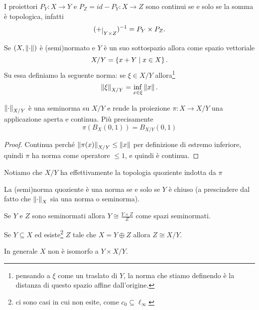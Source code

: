 \begin{remark}
I proiettori $P_Y:X\to Y$ e $P_Z=id-P_Y:X\to Z$ sono continui se e solo se la somma \`e topologica, infatti
\[(+\res{Y\times Z})\ii=P_Y\times P_Z.\]
\end{remark}

\begin{definition}
Se $(X,\left\Vert{\cdot}\right\Vert)$ \`e (semi)normato e $Y$ \`e un suo sottospazio allora come spazio vettoriale
\[X/Y=\left\{{x+Y\mid x\in X}\right\}.\]
Su essa definiamo la seguente norma: se $\xi\in X/Y$ allora\footnote{pensando a $\xi$ come un traslato di $Y$, la norma che stiamo definendo \`e la distanza di questo spazio affine dall'origine.}
\[\left\Vert{\xi}\right\Vert_{X/Y}=\inf_{x\in\xi}\left\Vert{x}\right\Vert.\]
\end{definition}

\begin{exercise}
$\left\Vert{\cdot}\right\Vert_{X/Y}$ \`e una seminorma su $X/Y$ e rende la proiezione $\pi:X\to X/Y$ una applicazione aperta e continua. Pi\`u precisamente
\[\pi(B_X(0,1))=B_{X/Y}(0,1)\]
\end{exercise}
\begin{proof}
Continua perch\'e $\left\Vert{\pi(x)}\right\Vert_{X/Y}\leq \left\Vert{x}\right\Vert$ per definizione di estremo inferiore, quindi $\pi$ ha norma come operatore $\leq 1$, e quindi \`e continua.
\end{proof}

\begin{remark}
Notiamo che $X/Y$ ha effettivamente la topologia quoziente indotta da $\pi$
\end{remark}

\begin{exercise}
La (semi)norma quoziente \`e una norma se e solo se $Y$ \`e chiuso (a prescindere dal fatto che $\left\Vert{\cdot}\right\Vert_X$ sia una norma o seminorma).
\end{exercise}

\begin{remark}
Se $Y$ e $Z$ sono seminormati allora $Y\cong \frac{Y\times Z}Z$ come spazi seminormati.
\end{remark}

\begin{remark}
Se $Y\subseteq X$ ed esiste\footnote{ci sono casi in cui non esite, come $c_0\subseteq \ell_\infty$} $Z$ tale che $X=Y\oplus Z$ allora $Z\cong X/Y$.
\end{remark}

\begin{remark}
In generale $X$ non \`e isomorfo a $Y\times X/Y$.
\end{remark}

